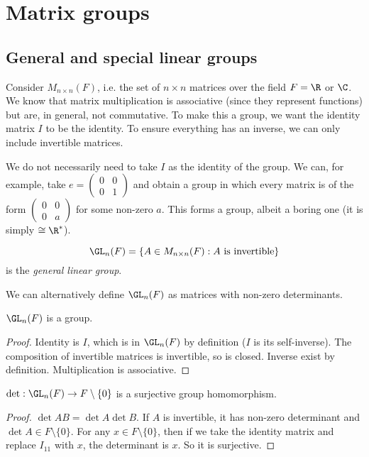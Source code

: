 \documentclass[a4pape]{article}
\begin{document}
\section{Matrix groups}
\subsection{General and special linear groups}
Consider $M_{n\times n}(F)$, i.e. the set of $n\times n$ matrices over the field $F = \R$ or $\C$. We know that matrix multiplication is associative (since they represent functions) but are, in general, not commutative. To make this a group, we want the identity matrix $I$ to be the identity. To ensure everything has an inverse, we can only include invertible matrices.

\note We do not necessarily need to take $I$ as the identity of the group. We can, for example, take $e = 
\begin{pmatrix}
  0 & 0\\
  0 & 1
\end{pmatrix}$ and obtain a group in which every matrix is of the form $\begin{pmatrix}
  0 & 0\\
  0 & a
\end{pmatrix}$ for some non-zero $a$. This forms a group, albeit a boring one (it is simply $\cong \R^*$).
\begin{defi}
  \[
  \GL_n(F) = \{A\in M_{n\times n}(F) : A\text{ is invertible}\}
  \]
 is the \emph{general linear group}.
\end{defi}
\note We can alternatively define $\GL_n(F)$ as matrices with non-zero determinants.

\begin{prop}
  $\GL_n(F)$ is a group.
\end{prop}
\begin{proof}
  Identity is $I$, which is in $\GL_n(F)$ by definition ($I$ is its self-inverse). The composition of invertible matrices is invertible, so is closed. Inverse exist by definition. Multiplication is associative.
\end{proof}

\begin{prop}
  $\det: \GL_n(F) \to F\setminus\{0\}$ is a surjective group homomorphism.
\end{prop}

\begin{proof}
  $\det AB = \det A\det B$. If $A$ is invertible, it has non-zero determinant and $\det A\in F\setminus\{0\}$. For any $x\in F\setminus\{0\}$, then if we take the identity matrix and replace $I_{11}$ with $x$, the determinant is $x$. So it is surjective.
\end{proof}
\end{document}

